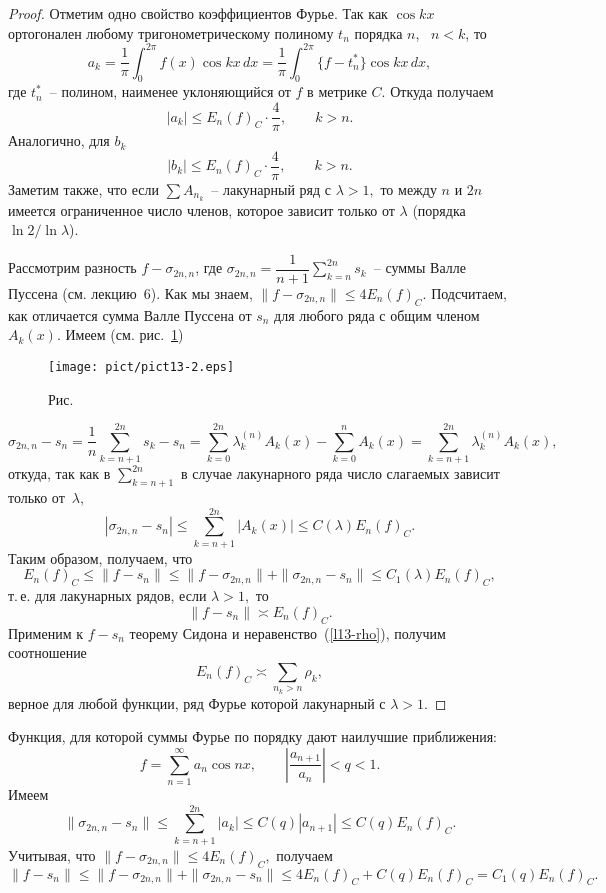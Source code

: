 \begin{proof}
Отметим одно свойство коэффициентов Фурье. Так как $\cos kx$ ортогонален
любому тригонометрическому полиному $t_n$ порядка $n$,~ $n<k$, то
$$
a_k=\frac{1}{\pi}\int_0^{2\pi} f(x)\cos kx\, dx=\frac{1}{\pi} \int_0^{2\pi}
\{ f-t_n^*\} \cos kx \, dx,
$$
где $t_n^*$~-- полином, наименее уклоняющийся от $f$ в метрике $C$. Откуда получаем
$$
|a_k|\le E_n(f)_C\cdot \frac{4}{\pi}, \qquad {k>n}.
$$
Аналогично, для $b_k$
$$
|b_k|\le E_n(f)_C\cdot \frac{4}{\pi}, \qquad {k>n}.
$$
Заметим также, что если $\sum A_{n_k}$~-- лакунарный ряд с $\lambda>1,$
то между $n$ и $2n$
имеется ограниченное число членов, которое зависит только от $\lambda$
(порядка $\ln 2/ \ln \lambda$).

Рассмотрим разность $f-\sigma_{2n,n}$, где $\sigma_{2n,n}=\dfrac{1}{n+1}
\sum\limits_{k=n}^{2n} s_k$~-- суммы Валле Пуссена (см. лекцию~6). Как мы знаем,
$\|f-\sigma_{2n,n}\|\le 4E_n(f)_C$. Подсчитаем, как отличается сумма Валле
Пуссена от $s_n$ {для любого ряда с общим членом $A_k(x)$. Имеем
{(см. рис.~\ref{r13-2})}}

 \bigskip
\begin{figure}[ht]
\begin{center}
\texttt{[image: pict/pict13-2.eps]}
\end{center}
 \bigskip
 \label{r13-2}

 \centerline{Рис.~\theris}
 \bigskip
\end{figure}


$$
\sigma_{2n,n}-s_n=\frac{1}{n}\sum\limits_{k=n+1}^{2n}
s_k-s_n=\sum\limits_{k=0}^{2n}\lambda_k^{(n)} A_k(x)-\sum\limits_{k=0}^n A_k(x)=
{\sum\limits_{k=n+1}^{2n}\lambda_k^{(n)} A_k(x)},
$$
откуда, так как в $\sum\limits_{k=n+1}^{2n}$ {в случае лакунарного ряда} число
слагаемых зависит только от~$\lambda,$
$$
|\sigma_{2n,n}-s_n|\le \sum\limits_{k=n+1}^{2n} |A_k(x)|\le C(\lambda)
E_n(f)_C.
$$
Таким образом, получаем, что
$$
E_n(f)_C\le \| f-s_n\|\le
\|f-\sigma_{2n,n}\|+\|\sigma_{2n,n}-s_n\|\le C_1(\lambda) E_n(f)_C,
$$
т.\,е. для лакунарных рядов, если $\lambda>1,$ то
$$
\|f-s_n\|\asymp E_n(f)_C.
$$
Применим к $f-s_n$ теорему Сидона и неравенство~(\ref{l13-rho}),
получим {соотношение}
$$
E_n(f)_C\asymp \sum\limits_{n_k>n}\rho_k,
$$
верное для любой функции, ряд Фурье которой лакунарный с $\lambda>1$.
\end{proof}

\begin{Example}
Функция, для которой суммы Фурье по порядку дают наилучшие приближения:
$$
f=\sum\limits_{n=1}^{\infty} a_n\cos nx,\qquad \left| \frac{a_{n+1}}{a_n}\right|<q<1.
$$
Имеем
$$
\|\sigma_{2n,n}-s_n\|\le \sum\limits_{k=n+1}^{2n} |a_k|\le C(q)|a_{n+1}|\le
C(q) E_n(f)_C.
$$
Учитывая, что $\|f-\sigma_{2n,n}\|\le 4E_n(f)_C,$
получаем
$$
\|f-s_n\|\le \|f-\sigma_{2n,n}\|+\|\sigma_{2n,n}-s_n\|\le
4E_n(f)_C+C(q)E_n(f)_C=C_1(q)E_n(f)_C.
$$
\end{Example}

